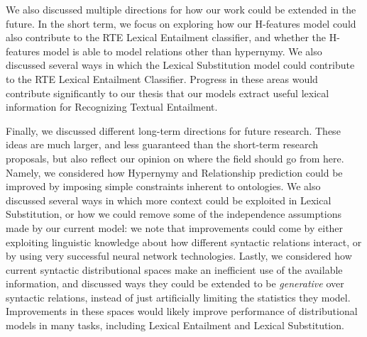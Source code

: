 \documentclass[12pt]{article}
\begin{document}
We also discussed multiple directions for how our work could be extended
in the future. In the short term, we focus on exploring how our H-features
model could also contribute to the RTE Lexical Entailment classifier, and
whether the H-features model is able to model relations other than hypernymy.
We also discussed several ways in which the Lexical Substitution model could
contribute to the RTE Lexical Entailment Classifier. Progress in these areas
would contribute significantly to our thesis that our models extract useful
lexical information for Recognizing Textual Entailment.

Finally, we discussed different long-term directions for future research. These
ideas are much larger, and less guaranteed than the short-term research
proposals, but also reflect our opinion on where the field should go from here.
Namely, we considered how Hypernymy and Relationship prediction could be
improved by imposing simple constraints inherent to ontologies. We also
discussed several ways in which more context could be exploited in Lexical
Substitution, or how we could remove some of the independence assumptions made
by our current model: we note that improvements could come by either
exploiting linguistic knowledge about how different syntactic relations
interact, or by using very successful neural network technologies. Lastly, we
considered how current syntactic distributional spaces make an inefficient use
of the available information, and discussed ways they could be extended to be
{\em generative} over syntactic relations, instead of just artificially
limiting the statistics they model. Improvements in these spaces would likely
improve performance of distributional models in many tasks, including
Lexical Entailment and Lexical Substitution.

\pagebreak


\end{document}
